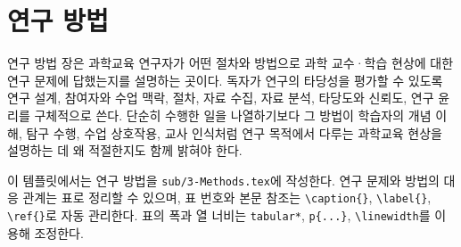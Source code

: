 \section{연구 방법}

%
%
%

연구 방법 장은 과학교육 연구자가 어떤 절차와 방법으로 과학 교수·학습 현상에 대한 연구 문제에 답했는지를 설명하는 곳이다.
독자가 연구의 타당성을 평가할 수 있도록 연구 설계, 참여자와 수업 맥락, 절차, 자료 수집, 자료 분석, 타당도와 신뢰도, 연구 윤리를 구체적으로 쓴다.
단순히 수행한 일을 나열하기보다 그 방법이 학습자의 개념 이해, 탐구 수행, 수업 상호작용, 교사 인식처럼 연구 목적에서 다루는 과학교육 현상을 설명하는 데 왜 적절한지도 함께 밝혀야 한다.

이 템플릿에서는 연구 방법을 \verb|sub/3-Methods.tex|에 작성한다.
연구 문제와 방법의 대응 관계는 표로 정리할 수 있으며, 표 번호와 본문 참조는 \verb|\caption{}|, \verb|\label{}|, \verb|\ref{}|로 자동 관리한다.
표의 폭과 열 너비는 \verb|tabular*|, \verb|p{...}|, \verb|\linewidth|를 이용해 조정한다.

